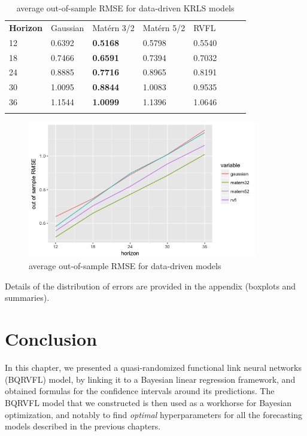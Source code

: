 \begin{table}[!htb]
\begin{center}
\caption{average out-of-sample RMSE for data-driven KRLS models}
\label{tab:min_value_no_ns}       %
\begin{tabular}{llllllll}
\hline\noalign{\smallskip}
\textbf{Horizon} & Gaussian & Mat\'ern 3/2  & Mat\'ern 5/2 & RVFL  \\
\noalign{\smallskip}\hline\noalign{\smallskip}
 12 & 0.6392 & \textbf{0.5168} & 0.5798 & 0.5540 \\
 18 & 0.7466 & \textbf{0.6591} & 0.7394 & 0.7032 \\
 24 & 0.8885 & \textbf{0.7716} & 0.8965 & 0.8191  \\
 30 & 1.0095 & \textbf{0.8844} & 1.0083 & 0.9535  \\
 36 & 1.1544 & \textbf{1.0099} & 1.1396 & 1.0646 \\
 \noalign{\smallskip}\hline
\end{tabular}
\end{center}
\end{table}

\newpage

\begin{figure}[!htb]
\centering
\includegraphics[width=10cm]{gfx/chapter-bayesianrvfl/oos_krls.png}
\caption{average out-of-sample RMSE for data-driven models}
\label{oos_krls}
\end{figure}

Details of the distribution of errors are provided in the appendix (boxplots and summaries). 

\newpage

\section{Conclusion}

In this chapter, we presented a quasi-randomized functional link neural networks (BQRVFL) model, by linking it to a Bayesian linear regression framework, and obtained formulas for the confidence intervals around its predictions. The BQRVFL model that we constructed is then used as a workhorse for Bayesian optimization, and notably to find \textit{optimal} hyperparameters for all the forecasting models described in the previous chapters.

